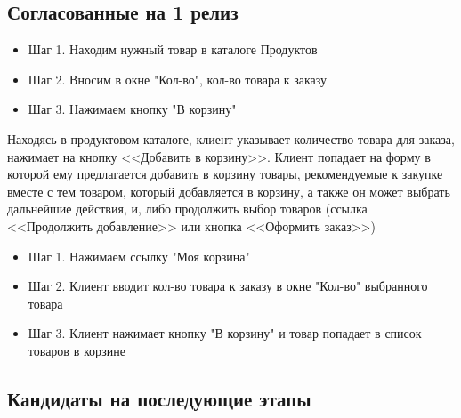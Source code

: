 \subsection{Согласованные на 1 релиз}
\fi
{}
{
\begin{itemize}
\item Шаг 1. Находим нужный товар в каталоге Продуктов
\item Шаг 2. Вносим в окне "Кол-во", кол-во товара к заказу
\item Шаг 3. Нажимаем кнопку "В корзину"
\end{itemize}

Находясь в продуктовом каталоге, клиент указывает количество товара для заказа, нажимает на кнопку <<Добавить в корзину>>. 
Клиент попадает на форму в которой ему предлагается добавить в корзину товары, рекомендуемые к закупке вместе с тем товаром, который добавляется в корзину, а также он может выбрать дальнейшие действия, и, либо продолжить выбор товаров (ссылка <<Продолжить добавление>> или кнопка <<Оформить заказ>>)
}
{
\begin{itemize}
\item Шаг 1. Нажимаем ссылку "Моя корзина"
\item Шаг 2. Клиент вводит кол-во товара к заказу в окне "Кол-во" выбранного товара
\item Шаг 3. Клиент нажимает кнопку "В корзину" и товар попадает в список товаров в корзине
\end{itemize}
}
\ifcand
\subsection{Кандидаты на последующие этапы}
\fi

